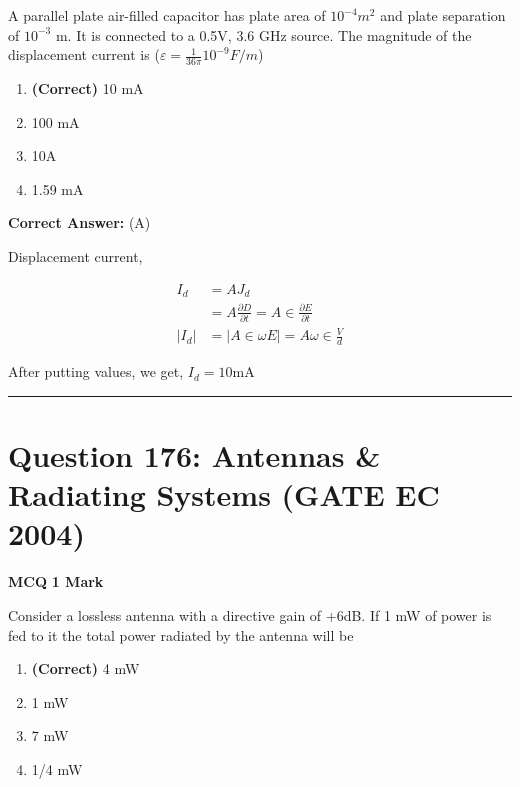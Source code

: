 \documentclass[11pt,a4paper]{article}
\begin{document}
\noindent A parallel plate air-filled capacitor has plate area of $10^{-4} m^{2}$ and plate
separation of $10^{-3}$ m. It is connected to a 0.5V, 3.6 GHz source. The
magnitude of the displacement current is ($\varepsilon =\frac{1}{36\pi}10^{-9} F/m$)


\begin{enumerate}[label=(\Alph*)]
    \item \textbf{(Correct)} 10 mA
    \item 100 mA
    \item 10A
    \item 1.59 mA
\end{enumerate}

\noindent \textbf{Correct Answer:} (A)

\begin{tcolorbox}[solbox, title=Detailed Solution -- Question 175]
Displacement current,

\[
\begin{aligned} I_{d} &=A J_{d} \\ &=A \frac{\partial D}{\partial t}=A \in \frac{\partial E}{\partial t} \\ \left|I_{d}\right| &=|A \in \omega E|=A \omega \in \frac{V}{d} \end{aligned}
\]

 After putting values, we get,
$I_{d}=10 \mathrm{mA}$
\end{tcolorbox}

\vspace{1.5em}
\hrule
\vspace{1.5em}

\section*{Question 176: Antennas \& Radiating Systems (GATE EC 2004)}
\noindent \textbf{\color{primary}MCQ} \hfill \textbf{\color{secondary}1 Mark}


\noindent Consider a lossless antenna with a directive gain of +6dB. If 1 mW of power is fed to it the total power radiated by the antenna will be


\begin{enumerate}[label=(\Alph*)]
    \item \textbf{(Correct)} 4 mW
    \item 1 mW
    \item 7 mW
    \item 1/4 mW
\end{enumerate}
\end{document}
